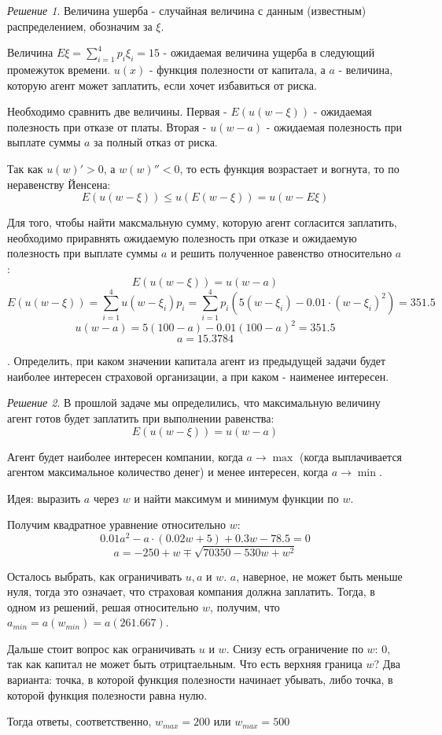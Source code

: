 \documentclass[%
12pt, %
final, %
oneside, %
onecolumn, %
centertags]{article} %
\theoremstyle{plain}
\theoremstyle{definition}
\theoremstyle{remark}
\newtheorem{solution}{Решение}
\begin{document}
\begin{solution}
	Величина ушерба - случайная величина с данным (известным) распределением, обозначим за $\xi$.

	Величина $E\xi = \sum\limits_{i=1}^4 p_i\xi_i = 15$ - ожидаемая величина ущерба в следующий промежуток времени. $u(x)$ - функция полезности от капитала, а $a$ - величина, которую агент может заплатить, если хочет избавиться от риска.

	Необходимо сравнить две величины. Первая - $E(u(w-\xi))$ - ожидаемая полезность при отказе от платы. Вторая - $u(w-a)$ - ожидаемая полезность при выплате суммы $a$ за полный отказ от риска.

	Так как $u(w)'>0$, а $w(w)''<0$, то есть функция возрастает и вогнута, то по неравенству Йенсена:
	$$E(u(w-\xi)) \leq u(E(w-\xi)) = u(w - E\xi)$$

	Для того, чтобы найти максмальную сумму, которую агент согласится заплатить, необходимо приравнять ожидаемую полезность при отказе и ожидаемую полезность при выплате суммы $a$ и решить полученное равенство относительно $a$:
	$$E(u(w-\xi)) = u(w - a)$$
	$$E(u(w-\xi)) = \sum\limits_{i=1}^4 u(w-\xi_i)p_i = \sum\limits_{i=1}^4 p_i (5(w-\xi_i)-0.01\cdot (w-\xi_i)^2) = 351.5$$
	$$u(w - a) = 5 (100-a) - 0.01(100-a)^2 = 351.5$$
	$$a = 15.3784$$
\end{solution}

. Определить, при каком значении капитала агент из предыдущей задачи будет наиболее интересен страховой организации, а при каком - наименее интересен.

\begin{solution}
	В прошлой задаче мы определились, что максимальную величину агент готов будет заплатить при выполнении равенства:
	$$E(u(w-\xi)) = u(w - a)$$

	Агент будет наиболее интересен компании, когда $a \to \max$ (когда выплачивается агентом максимальное количество денег) и менее интересен, когда $a \to \min$.

	Идея: выразить $a$ через $w$ и найти максимум и минимум функции по $w$.

	Получим квадратное уравнение относительно $w$:
	$$0.01a^2 - a \cdot (0.02w+5) + 0.3w - 78.5 = 0$$
	$$a = -250 + w \mp \sqrt{70350-530w+w^2}$$

	Осталось выбрать, как ограничивать $u,a$ и $w$. $a$, наверное, не может быть меньше нуля, тогда это означает, что страховая компания должна заплатить. Тогда, в одном из решений, решая относительно $w$, получим, что $a_{min} = a(w_{min}) = a(261.667)$.

	Дальше стоит вопрос как ограничивать $u$ и $w$. Снизу есть ограничение по $w$: 0, так как капитал не может быть отрицтаельным. Что есть верхняя граница $w$? Два варианта: точка, в которой функция полезности начинает убывать, либо точка, в которой функция полезности равна нулю.

	Тогда ответы, соответственно, $w_{max} = 200$ или $w_{max} = 500$
\end{solution}
\end{document}
